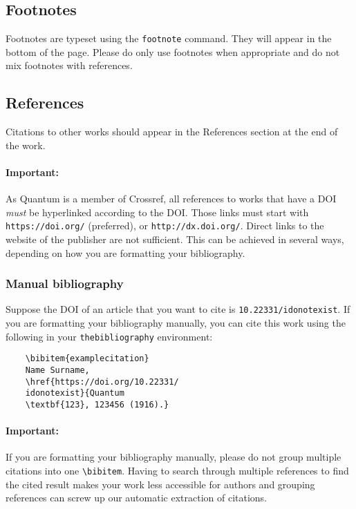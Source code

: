 \documentclass[a4paper,noarxiv,onecolumn]{quantumarticle}
\begin{document}
	\subsection{Footnotes}
	Footnotes are typeset using the \texttt{footnote} command. They will appear in the bottom of the page. Please do only use footnotes when appropriate and do not mix footnotes with references.
	
	\subsection{References}	
	Citations to other works should appear in the References section at the end of the work.
	
	\paragraph{Important:} As Quantum is a member of Crossref, all references to works that have a DOI \emph{must} be hyperlinked according to the DOI. Those links must start with \texttt{https://doi.org/} (preferred), or \texttt{http://dx.doi.org/}. Direct links to the website of the publisher are not sufficient. This can be achieved in several ways, depending on how you are formatting your bibliography.
	
	\subsubsection{Manual bibliography}
	Suppose the DOI of an article that you want to cite is \texttt{10.22331/idonotexist}. If you are formatting your bibliography manually, you can cite this work using the following in your \texttt{thebibliography} environment:
	\begin{verbatim}
	\bibitem{examplecitation}
	Name Surname,
	\href{https://doi.org/10.22331/
	idonotexist}{Quantum
	\textbf{123}, 123456 (1916).}
	\end{verbatim}
	
	\paragraph{Important:} If you are formatting your bibliography manually, please do not group multiple citations into one \texttt{\textbackslash{}bibitem}.
	Having to search through multiple references to find the cited result makes your work less accessible for authors and grouping references can screw up our automatic extraction of citations.
	
\end{document}
